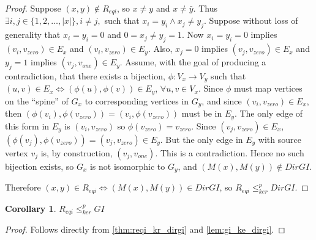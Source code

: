 \documentclass[draft]{article}
\newtheorem{corollary}{Corollary}%
\theoremstyle{definition}
\newcommand{\kr}{\leq^{p}_{ker}} %
\begin{document}
\begin{proof}
  Suppose $(x, y)\notin R_{eqi}$, so $x\neq y$ and $x\neq\bar{y}$. Thus
  $\exists i,j\in\{1,2,\ldots,|x|\}, i\neq j,$ such that $x_i=y_i\land x_j\neq
  y_j$. Suppose without loss of generality that $x_i=y_i=0$ and $0=x_j\neq
  y_j=1$. Now $x_i=y_i=0$ implies $(v_i, v_{zero})\in E_x$ and $(v_i,
  v_{zero})\in E_y$. Also, $x_j=0$ implies $(v_j, v_{zero})\in E_x$ and $y_j=1$
  implies $(v_j, v_{one})\in E_y$. Assume, with the goal of producing a
  contradiction, that there exists a bijection, $\phi:V_x\to V_y$ such that
  $(u,v)\in E_x\iff(\phi(u),\phi(v))\in E_y$, $\forall u,v\in V_x$. Since
  $\phi$ must map vertices on the ``spine'' of $G_x$ to corresponding vertices
  in $G_y$, and since $(v_i, v_{zero})\in E_x$, then $(\phi(v_i),
  \phi(v_{zero}))=(v_i, \phi(v_{zero}))$ must be in $E_y$. The only edge of
  this form in $E_y$ is $(v_i, v_{zero})$ so $\phi(v_{zero})=v_{zero}$. Since
  $(v_j, v_{zero})\in E_x$, $(\phi(v_j), \phi(v_{zero}))=(v_j, v_{zero})\in
  E_y$. But the only edge in $E_y$ with source vertex $v_j$ is, by
  construction, $(v_j, v_{one})$. This is a contradiction. Hence no such
  bijection exists, so $G_x$ is not isomorphic to $G_y$, and $(M(x),
  M(y))\notin DirGI$.

  Therefore $(x, y)\in R_{eqi} \iff (M(x), M(y))\in DirGI$, so $R_{eqi}\kr
  DirGI$.
\end{proof}

\begin{corollary}$R_{eqi}\kr GI$\end{corollary}
\begin{proof}Follows directly from \autoref{thm:reqi_kr_dirgi} and
  \autoref{lem:gi_ke_dirgi}.\end{proof}
\end{document}
